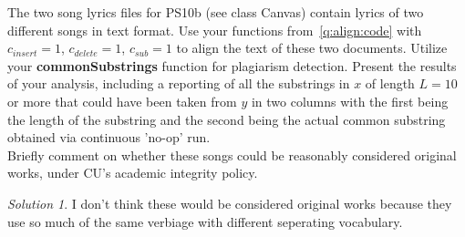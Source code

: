 \documentclass[12pt]{article}
\theoremstyle{remark}
\newtheorem*{solution}{Solution}
\begin{document}
\begin{enumerate}
\begin{enumerate}
	The two {song lyrics} files for PS10b (see class Canvas) contain lyrics of two different songs in text format. Use your functions from~\eqref{q:align:code} with $c_{insert} = 1$, $c_{delete} = 1$, $c_{sub} = 1$ to align the text of these two documents. Utilize your \textbf{commonSubstrings} function for plagiarism detection. Present the results of your analysis, including a reporting of all the substrings in $x$ of length $L=10$ or more that could have been taken from $y$ in two columns with the first being the length of the substring and the second being the actual common substring obtained via continuous 'no-op' run.  \\Briefly comment on whether these songs could be reasonably considered original works, under CU's academic integrity policy.\pagebreak
	
	
	\begin{solution}
	I don't think these would be considered original works because they use so much of the same verbiage with different seperating vocabulary. 
	\end{solution}
	
	\end{enumerate}
\end{enumerate}
\end{document}
